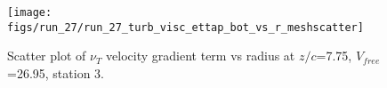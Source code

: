 \begin{figure}[H]
\centering
\texttt{[image: figs/run\_27/run\_27\_turb\_visc\_ettap\_bot\_vs\_r\_meshscatter]}
\caption{Scatter plot of $\nu_T$ velocity gradient term vs radius at $z/c$=7.75, $V_{free}$=26.95, station 3.}
\label{fig:run_27_turb_visc_ettap_bot_vs_r_meshscatter}
\end{figure}


